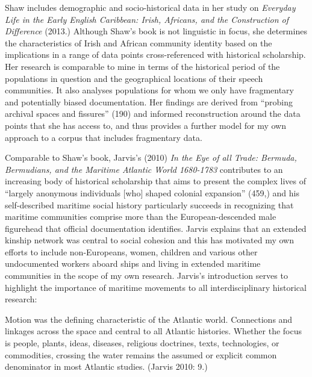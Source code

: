 \begin{styleStandard}
Shaw includes demographic and socio-historical data in her study on \textit{Everyday Life in the Early English Caribbean: Irish, Africans, and the Construction of Difference} (2013.) Although Shaw’s book is not linguistic in focus, she determines the characteristics of Irish and African community identity based on the implications in a range of data points cross-referenced with historical scholarship. Her research is comparable to mine in terms of the historical period of the populations in question and the geographical locations of their speech communities. It also analyses populations for whom we only have fragmentary and potentially biased documentation. Her findings are derived from “probing archival spaces and fissures” (190) and informed reconstruction around the data points that she has access to, and thus provides a further model for my own approach to a corpus that includes fragmentary data. 
\end{styleStandard}


\begin{styleStandard}
Comparable to Shaw’s book, Jarvis’s (2010) \textit{In the Eye of all Trade: Bermuda, Bermudians, and the Maritime Atlantic World 1680-1783} contributes to an increasing body of historical scholarship that aims to present the complex lives of “largely anonymous individuals [who] shaped colonial expansion” (459,) and his self-described maritime social history particularly succeeds in recognizing that maritime communities comprise more than the European-descended male figurehead that official documentation identifies. Jarvis explains that an extended kinship network was central to social cohesion and this has motivated my own efforts to include non-Europeans, women, children and various other undocumented workers aboard ships and living in extended maritime communities in the scope of my own research. Jarvis’s introduction serves to highlight the importance of maritime movements to all interdisciplinary historical research: 
\end{styleStandard}


\begin{styleStandard}
Motion was the defining characteristic of the Atlantic world. Connections and linkages across the space and central to all Atlantic histories. Whether the focus is people, plants, ideas, diseases, religious doctrines, texts, technologies, or commodities, crossing the water remains the assumed or explicit common denominator in most Atlantic studies. (Jarvis 2010: 9.)
\end{styleStandard}


